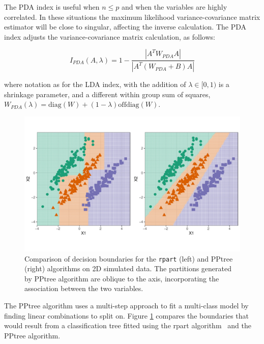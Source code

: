 \documentclass[12pt]{article}\usepackage[]{graphicx}\usepackage[]{color}
\makeatletter
\def\maxwidth{ %
  \ifdim\Gin@nat@width>\linewidth
    \linewidth
  \else
    \Gin@nat@width
  \fi
}
\newenvironment{knitrout}{}{} %
\makeatother
\begin{document}
The PDA index is useful when $n\leq p$ and when the variables are highly correlated. In these situations the maximum likelihood variance-covariance matrix estimator will be close to singular, affecting the inverse calculation. The PDA index adjusts the variance-covariance matrix calculation, as follows:

\begin{equation}
I_{PDA}(A,\lambda)=1-\frac{|A^T W_{PDA}A|}{|A^T (W_{PDA}+B) A|}
\end{equation}

\noindent where notation as for the LDA index, with the addition of $\lambda \in [0,1)$ is a shrinkage parameter, and a different within group sum of squares, $W_{PDA}(\lambda)=\mbox{diag}(W)+(1-\lambda)\mbox{offdiag}(W)$.


\begin{figure}[!t]
\begin{knitrout}
\color{fgcolor}
\includegraphics[width=\maxwidth]{figure/boundss-1} 

\end{knitrout}
 \vspace*{-0.3cm}
 \caption{Comparison of decision boundaries for the  \texttt{rpart} (left) and PPtree (right) algorithms on 2D simulated data. The partitions generated by PPtree algorithm are oblique to the axis, incorporating the association between the two variables.\label{bounds}}
\end{figure}


The PPtree algorithm uses a multi-step approach to fit a multi-class model by finding linear combinations to split on. Figure \ref{bounds} compares the boundaries that would result from a classification tree fitted using the rpart algorithm~\citep{therneau2010rpart} and the PPtree algorithm.
\end{document}
